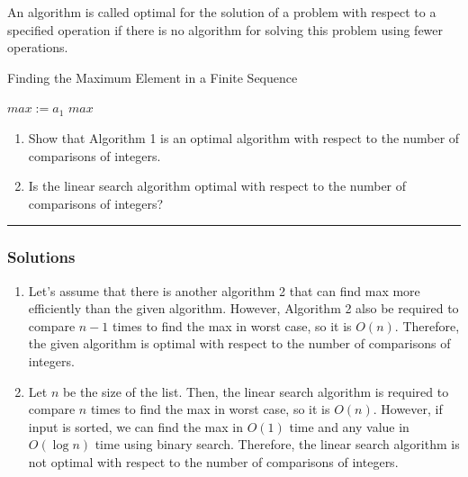 \newpage
\begin{question}
An algorithm is called optimal for the solution of a problem with respect to a specified operation if there is no algorithm for solving this problem using fewer operations.

\begin{algorithm}
    \caption{Finding the Maximum Element in a Finite Sequence}
    \begin{algorithmic}
    \State $max := a_1$
        \EndIf
    \EndFor
    \State \Return $max$ 
    \EndProcedure
    \end{algorithmic}
\end{algorithm}

\begin{enumerate}
    \item Show that Algorithm 1 is an optimal algorithm with respect to the number of comparisons of integers.
    \item Is the linear search algorithm optimal with respect to the number of comparisons of integers?
\end{enumerate}
\end{question}

\par\noindent\rule{\textwidth}{0.5pt}

\subsubsection*{Solutions}

\begin{enumerate}
    \item
    Let's assume that there is another algorithm 2 that can find max more efficiently than the given algorithm. However, Algorithm 2 also be required to compare $n-1$ times to find the max in worst case, so it is $O(n)$. Therefore, the given algorithm is optimal with respect to the number of comparisons of integers.
    
    \item
    Let $n$ be the size of the list.
    Then, the linear search algorithm is required to compare $n$ times to find the max in worst case, so it is $O(n)$.
    However, if input is sorted, we can find the max in $O(1)$ time and any value in $O(\log n)$ time using binary search. Therefore, the linear search algorithm is not optimal with respect to the number of comparisons of integers.
\end{enumerate}
